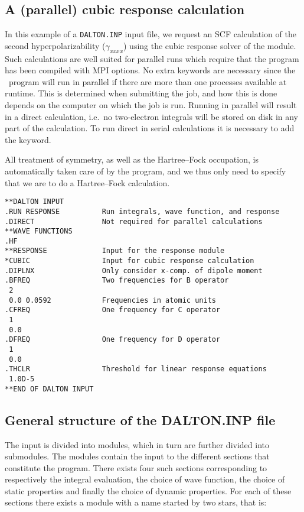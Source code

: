 \subsection{A (parallel) cubic response calculation}

In this example of a \verb|DALTON.INP| input file, we request an SCF
calculation of the second
hyperpolarizability
($\gamma_{xxxx}$) using
the cubic response solver
of the {\resp} module. Such calculations are well suited for parallel runs
which require that the program has been compiled with MPI options. No extra
keywords are necessary since the \dalton\ program will run in parallel if there are more than one processes available at runtime. This is determined when
submitting the job, and how this is done depends on the computer on which the
job is run. Running in parallel will result in a direct calculation, i.e.\
no two-electron integrals will be stored on disk in any part of the
calculation. To run direct in serial calculations it is necessary to add the  keyword.

All treatment  of symmetry, as well as the Hartree--Fock
occupation, is
automatically taken care of by the program, and we thus only need to
specify that we are to do a Hartree--Fock calculation.

\begin{verbatim}
**DALTON INPUT
.RUN RESPONSE          Run integrals, wave function, and response
.DIRECT                Not required for parallel calculations
**WAVE FUNCTIONS
.HF
**RESPONSE             Input for the response module
*CUBIC                 Input for cubic response calculation
.DIPLNX                Only consider x-comp. of dipole moment
.BFREQ                 Two frequencies for B operator
 2
 0.0 0.0592            Frequencies in atomic units
.CFREQ                 One frequency for C operator
 1
 0.0
.DFREQ                 One frequency for D operator
 1
 0.0
.THCLR                 Threshold for linear response equations
 1.0D-5
**END OF DALTON INPUT
\end{verbatim}


\subsection{General structure of the DALTON.INP file}\label{sec:inputstructure}

The input is divided into modules, which in turn are
further divided into submodules\index{submodule}. The modules contain
the input to the different
sections that constitute the {\dalton} program. There exists
four such sections corresponding to respectively the integral
evaluation, the choice of wave function, the
choice of static properties\index{molecular properties} and finally
the choice of dynamic properties\index{response}. For each of
these sections there exists a module with a name started by two stars,
that is:

